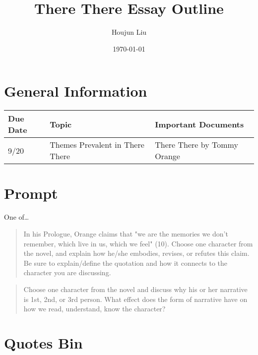 \documentclass[letterpaper]{article}
\author{Houjun Liu}
\date{\today}
\title{There There Essay Outline}
\renewcommand{\tableofcontents}{}
\begin{document}
\tableofcontents


\section{General Information}
\label{sec:org1b99968}
\begin{center}
\begin{tabular}{lll}
Due Date & Topic & Important Documents\\
\hline
9/20 & Themes Prevalent in There There & There There by Tommy Orange\\
\end{tabular}
\end{center}

\section{Prompt}
\label{sec:org31d8017}
One of\ldots{}

\begin{quote}
In his Prologue, Orange claims that "we are the memories we don’t remember, which live in us, which we feel" (10). Choose one character from the novel, and explain how he/she embodies, revises, or refutes this claim. Be sure to explain/define the quotation and how it connects to the character you are discussing.
\end{quote}

\begin{quote}
Choose one character from the novel and discuss why his or her narrative is 1st, 2nd, or 3rd person. What effect does the form of narrative have on how we read, understand, know the character?
\end{quote}

\section{Quotes Bin}
\label{sec:orgc9bed77}
\end{document}
